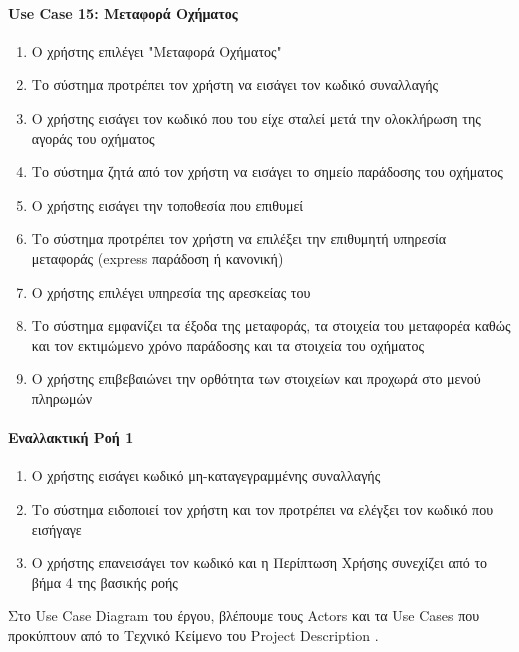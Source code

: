 \documentclass{../ol-softwaremanual}
\begin{document}
\paragraph{\en Use Case 15: \gr Μεταφορά Οχήματος}  
\begin{enumerate}
	\item Ο χρήστης επιλέγει \en"\gr Μεταφορά Οχήματος\en"\gr
	\item Το σύστημα προτρέπει τον χρήστη να εισάγει τον κωδικό συναλλαγής
	\item Ο χρήστης εισάγει τον κωδικό που του είχε σταλεί μετά την ολοκλήρωση της αγοράς του οχήματος
	\item Το σύστημα ζητά από τον χρήστη να εισάγει το σημείο παράδοσης του οχήματος
	\item Ο χρήστης εισάγει την τοποθεσία που επιθυμεί
	\item Το σύστημα προτρέπει τον χρήστη να επιλέξει την επιθυμητή υπηρεσία μεταφοράς (\en express \gr παράδοση ή κανονική)
	\item Ο χρήστης επιλέγει υπηρεσία της αρεσκείας του
	\item Το σύστημα εμφανίζει τα έξοδα της μεταφοράς, τα στοιχεία του μεταφορέα καθώς και τον εκτιμώμενο χρόνο παράδοσης και τα στοιχεία του οχήματος
	\item Ο χρήστης επιβεβαιώνει την ορθότητα των στοιχείων και προχωρά στο μενού πληρωμών	
\end{enumerate}

	\paragraph{Εναλλακτική Ροή 1}
	\begin{enumerate}
		\item Ο χρήστης εισάγει κωδικό μη-καταγεγραμμένης συναλλαγής
		\item Το σύστημα ειδοποιεί τον χρήστη και τον προτρέπει να ελέγξει τον κωδικό που εισήγαγε
		\item Ο χρήστης επανεισάγει τον κωδικό και η Περίπτωση Χρήσης συνεχίζει από το βήμα 4 της βασικής ροής
	\end{enumerate}


\newpage

	
	\vspace{25pt}
	
	\flushleft
	
	Στο \en Use Case Diagram \gr του έργου, βλέπουμε τους \en Actors \gr και τα \en Use Cases \gr που προκύπτουν από το Τεχνικό Κείμενο του \en Project Description \gr.
	
\end{document}
